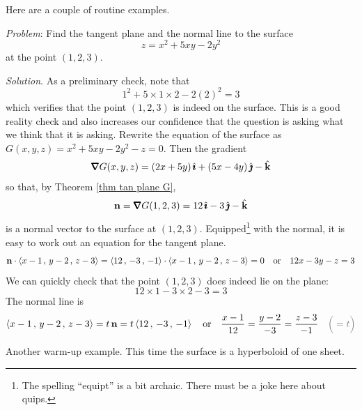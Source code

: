 Here are a couple of routine examples.
\begin{eg}\label{eg tan plane C}
\noindent\textit{Problem}:
Find the tangent plane and the normal line to the surface
\begin{equation*}
z= x^2+5xy-2y^2
\end{equation*}
at the point $(1,2,3)$.

\medskip
\noindent\textit{Solution}. 
As a preliminary check, note that
\begin{equation*}
1^2+5\times 1\times 2-2(2)^2=3
\end{equation*} 
which verifies that the point $(1,2,3)$ is indeed on the surface.
This is a good reality check and also increases our confidence that the
question is asking what we think that it is asking.
Rewrite the equation of the surface as $G(x,y,z)=x^2+5xy-2y^2-z=0$.
Then the gradient
\begin{align*}
\vnabla G(x,y,z) = (2x+5y)\,\hi +(5x-4y)\,\hj-\hk
\end{align*}
so that, by Theorem \ref{thm tan plane G},
\begin{equation*}
\vn = \vnabla G(1,2,3) = 12\,\hi -3\,\hj-\hk
\end{equation*}
is a normal vector to the surface at $(1,2,3)$.
Equipped\footnote{The spelling ``equipt'' is a bit archaic. There must 
be a joke here about quips.} with the normal, it is easy to work out an equation for
the tangent plane.
\begin{equation*}
\mathbf{n}\cdot\left< x-1\,,\,y-2\,,\,z-3 \right>
=\left< 12\,,\,-3\,,\, -1\right>\cdot\left< x-1\,,\,y-2\,,\,z-3 \right>
=0\quad\text{or}\quad
12x -3y -z = 3
\end{equation*}
We can quickly check that the point $(1,2,3)$ does indeed lie on the plane:
\begin{equation*}
12\times 1 -3\times 2 -3 = 3
\end{equation*}
The normal line is
\begin{equation*}
\llt x-1\,,\,y-2\,,\,z-3 \rgt
=t\,\vn = t\llt 12\,,\,-3\,,\, -1\rgt
\quad\text{or}\quad
\frac{x-1}{12} = \frac{y-2}{-3} = \frac{z-3}{-1}\quad 
  \textcolor{gray}{\Big(=t\Big)}
\end{equation*} 

\end{eg}

Another warm-up example. This time the surface is a hyperboloid of one sheet.

